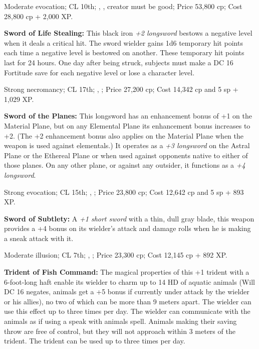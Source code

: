 Moderate evocation; CL 10th; , , creator must be good; Price 53,800 cp; Cost 28,800 cp + 2,000 XP.


\textbf{Sword of Life Stealing:} This black iron \emph{+2 longsword} bestows a negative level when it deals a critical hit. The sword wielder gains 1d6 temporary hit points each time a negative level is bestowed on another. These temporary hit points last for 24 hours. One day after being struck, subjects must make a DC 16 Fortitude save for each negative level or lose a character level.

Strong necromancy; CL 17th; , ; Price 27,200 cp; Cost 14,342 cp and 5 sp + 1,029 XP.


\textbf{Sword of the Planes:} This longsword has an enhancement bonus of +1 on the Material Plane, but on any Elemental Plane its enhancement bonus increases to +2. (The +2 enhancement bonus also applies on the Material Plane when the weapon is used against elementals.) It operates as a \emph{+3 longsword} on the Astral Plane or the Ethereal Plane or when used against opponents native to either of those planes. On any other plane, or against any outsider, it functions as a \emph{+4 longsword}.

Strong evocation; CL 15th; , ; Price 23,800 cp; Cost 12,642 cp and 5 sp + 893 XP.


\textbf{Sword of Subtlety:} A \emph{+1 short sword} with a thin, dull gray blade, this weapon provides a +4 bonus on its wielder's attack and damage rolls when he is making a sneak attack with it.

Moderate illusion; CL 7th; , ; Price 23,300 cp; Cost 12,145 cp + 892 XP.



% 
\textbf{Trident of Fish Command:} The magical properties of this +1 trident with a 6-foot-long haft enable its wielder to charm up to 14 HD of aquatic animals (Will DC 16 negates, animals get a +5 bonus if currently under attack by the wielder or his allies), no two of which can be more than 9 meters apart. The wielder can use this effect up to three times per day. The wielder can communicate with the animals as if using a speak with animals spell. Animals making their saving throw are free of control, but they will not approach within 3 meters of the trident. The trident can be used up to three times per day.

